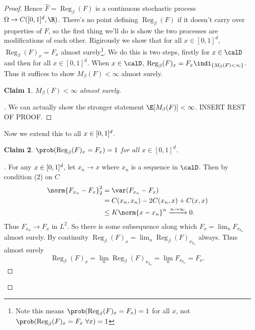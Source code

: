 \documentclass[fontsize=12pt, DIV=10]{scrreprt}
\theoremstyle{mydefn}
\newtheorem{claim}{Claim}
\theoremstyle{remark}
\newenvironment{subproof}[1][\proofname]{%
  \renewcommand{\qedsymbol}{$\blacksquare$}%
  \begin{proof}[#1]%
}{%
  \end{proof}%
}
\DeclareMathOperator{\reg}{Reg}
\begin{document}
\begin{proof}
	Hence $\hat{F} = \reg_{\beta}(F)$ is a continuous stochastic process $\Omega \to C(\unitbox, \R)$. There's no point defining $\reg_{\beta}(F)$ if it doesn't carry over properties of $F$, so the first thing we'll do is show the two processes are modifications of each other. Rigirously we show that for all $x \in [0, 1]^d$, $\reg_{\beta}(F)_x = F_x$ almost surely\footnote{Note this means $\prob(\reg_{\beta}(F)_x = F_x) = 1$ for all $x$, not $\prob(\reg_{\beta}(F)_x = F_x \ \forall x) = 1$}. We do this is two steps, firstly for $x \in \calD$ and then for all $x \in [0, 1]^d$. When $x \in \calD$, $\reg_{\beta}(F)_x = F_x \indi_{\{M_{\beta}(F) < \infty\}}$. Thus it suffices to show $M_{\beta}(F) < \infty$ almost surely.
	\begin{claim}
		$M_{\beta}(F) < \infty$ almost surely.
	\end{claim}
	\begin{subproof}
		We can actually show the stronger statement $\E[M_{\beta}(F)] < \infty$. INSERT REST OF PROOF.
	\end{subproof}
	
	Now we extend this to all $x \in [0,1]^d$.
	\begin{claim}
		$\prob(\reg_{\beta}(F)_x = F_x) = 1$ for all $x \in [0, 1]^d$.
	\end{claim}
	\begin{subproof}
		For any $x \in [0,1]^d$, let $x_n \to x$ where $x_n$ is a sequence in $\calD$. Then by condition (2) on $C$
		\begin{align}
			\norm{F_{x_n} - F_x}_2^2
			&= \var(F_{x_n} - F_x) \\
			&= C(x_n, x_n) - 2C(x_n, x) + C(x, x) \\
			&\leq K \norm{x - x_n}^{\alpha} \xrightarrow{n \to \infty} 0.
		\end{align}
		Thus $F_{x_n} \to F_x$ in $L^2$. So there is some subsequence along which $F_x = \lim_n F_{x_{k_n}}$ almost surely. By continuity $\reg_{\beta}(F)_x = \lim_n \reg_{\beta}(F)_{x_{k_n}}$ always. Thus almost surely
		\begin{equation}
			\reg_{\beta}(F)_x = \lim_n \reg_{\beta}(F)_{x_{k_n}}
			= \lim_n F_{x_{k_n}} = F_x.
		\end{equation}
	\end{subproof}


\end{proof}
\end{document}
